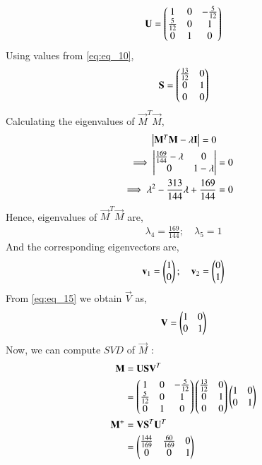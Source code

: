 \documentclass[journal,12pt,twocolumn]{IEEEtran}
\begin{document}
\begin{align} \label{eq:eq_13}
    \mathbf{U} = \begin{pmatrix}1 & 0 & -\frac{5}{12} \\ \frac{5}{12} & 0 & 1 \\ 0 & 1 & 0\end{pmatrix}
\end{align}
Using values from \eqref{eq:eq_10},
\begin{align} \label{eq:eq_14}
    \mathbf{S} = \begin{pmatrix}\frac{13}{12} & 0 \\ 0 & 1 \\ 0 & 0\end{pmatrix} 
\end{align}
Calculating the eigenvalues of $\vec{M}^T\vec{M}$,
\begin{align}
    \begin{vmatrix}\mathbf{M}^T\mathbf{M} - \lambda \mathbf{I}\end{vmatrix} = 0 \nonumber \\
    \implies \begin{vmatrix}\frac{169}{144}-\lambda & 0 \\ 0 & 1-\lambda\end{vmatrix} &= 0 \nonumber \\
    \implies \lambda^2 - \frac{313}{144}\lambda + \frac{169}{144} &= 0 \nonumber
\end{align}
Hence, eigenvalues of $\vec{M}^T\vec{M}$ are,
\begin{align}
    \lambda_4 = \frac{169}{144}; \quad \lambda_5 = 1 \nonumber
\end{align}
And the corresponding eigenvectors are,
\begin{align}
    \mathbf{v}_1 = \begin{pmatrix}1 \\ 0\end{pmatrix}; \quad 
    \mathbf{v}_2 = \begin{pmatrix}0 \\ 1\end{pmatrix} \label{eq:eq_15}
\end{align}
From \eqref{eq:eq_15} we obtain $\vec{V}$ as,
\begin{align} \label{eq:eq_16}
    \mathbf{V} = \begin{pmatrix}1 & 0 \\ 0 & 1\end{pmatrix}
\end{align}
Now, we can compute $\textit{SVD}$ of $\vec{M}$ :
\begin{align}
	\label{eq16}\vec{M} &= \vec{U}\Vec{S}\vec{V}^T\\
	\label{eq17} &= \myvec{1 & 0 & -\frac{5}{12}\\ \frac{5}{12} & 0 & 1 \\0 & 1 & 0}\myvec{\frac{13}{12} & 0 \\0 & 1\\0 & 0} \myvec{1 & 0\\0 & 1}\\
	\label{eq18}\vec{M}^{+} &= \vec{V}\Vec{S}^T\vec{U}^T\\
	\label{eq20}&=\myvec{\frac{144}{169} & \frac{60}{169} & 0\\0 & 0 & 1}
\end{align}
\end{document}
